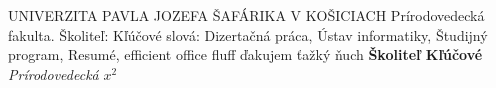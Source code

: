 \documentclass{report}
\begin{document}
\MakeUppercase{Univerzita Pavla Jozefa Šafárika v Košiciach} Prírodovedecká fakulta. Školiteľ: Kľúčové slová: Dizertačná práca, Ústav informatiky, Študijný program, Resumé, efficient office fluff ďakujem ťažký ňuch \textbf{Školiteľ Kľúčové} \textit{Prírodovedecká} $x^2$
\end{document}
